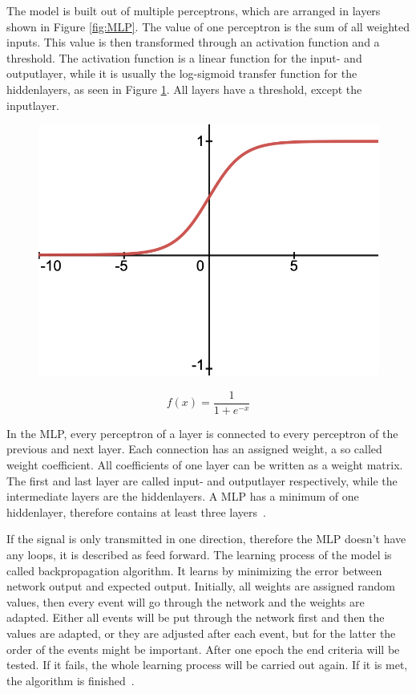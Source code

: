 \documentclass[11pt]{scrartcl}
\begin{document}
	The model is built out of multiple perceptrons, which are arranged in layers shown in Figure \ref{fig:MLP}. The value of one perceptron is the sum of all weighted inputs. This value is then transformed through an activation function and a threshold. The activation function is a linear function for the input- and outputlayer, while it is usually the log-sigmoid transfer function for the hiddenlayers, as seen in Figure \ref{fig:log-sigmoid function}. All layers have a threshold, except the inputlayer. 
	
	\begin{figure}[H]
	\centering
	\begin{minipage}{.5\textwidth}
	  \centering
	  \includegraphics[width=0.5\linewidth]{figures/log-sigmoid.png}
	\end{minipage}%
	\begin{minipage}{.5\textwidth}
	  \centering
		\begin{equation*}
			f(x) = \frac{1}{1 +e^{-x}}
		\end{equation*}
	\end{minipage}
	\label{fig:log-sigmoid function}
	\end{figure}
	
	In the MLP, every perceptron of a layer is connected to every perceptron of the previous and next layer. Each connection has an assigned weight, a so called weight coefficient. All coefficients of one layer can be written as a weight matrix. The first and last layer are called input- and outputlayer respectively, while the intermediate layers are the hiddenlayers. A MLP has a minimum of one hiddenlayer, therefore contains at least three layers~\cite{MLP08}.
	
	If the signal is only transmitted in one direction, therefore the MLP doesn't have any loops, it is described as feed forward. The learning process of the model is called backpropagation algorithm. It learns by minimizing the error between network output and expected output. Initially, all weights are assigned random values, then every event will go through the network and the weights are adapted. Either all events will be put through the network first and then the values are adapted, or they are adjusted after each event, but for the latter the order of the events might be important. After one epoch the end criteria will be tested. If it fails, the whole learning process will be carried out again. If it is met, the algorithm is finished~\cite{MLP09}.
	
\end{document}
